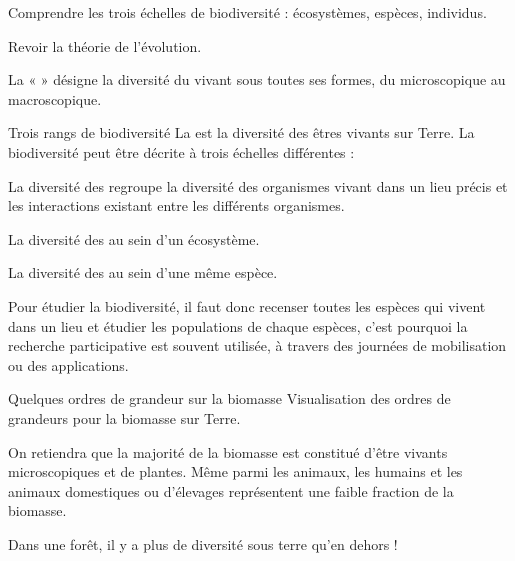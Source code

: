 \begin{multicols}{2}
\begin{objectifs}
  \item Comprendre les trois échelles de biodiversité : écosystèmes, espèces, individus.
  \item Revoir la théorie de l'évolution.
\end{objectifs}

\begin{contexte}
  La «  » désigne la diversité du vivant sous toutes ses formes, du microscopique au macroscopique.
  
\end{contexte}

\begin{doc}{Trois rangs de biodiversité}
  La  est la diversité des êtres vivants sur Terre. 
  La biodiversité peut être décrite à trois échelles différentes :
  \begin{listePoints}
    \item La diversité des  regroupe la diversité des organismes vivant dans un lieu précis et les interactions existant entre les différents organismes.
    \item La diversité des  au sein d'un écosystème.
    \item La diversité des  au sein d'une même espèce.
  \end{listePoints}

  Pour étudier la biodiversité, il faut donc recenser toutes les espèces qui vivent dans un lieu et étudier les populations de chaque espèces, c'est pourquoi la recherche participative est souvent utilisée, à travers des journées de mobilisation ou des applications.
\end{doc}

\begin{doc}{Quelques ordres de grandeur sur la biomasse}
  \textcolor{couleurPrim}{\faArrowLeft} Visualisation des ordres de grandeurs pour la biomasse sur Terre.

  On retiendra que la majorité de la biomasse est constitué d'être vivants microscopiques et de plantes.
  Même parmi les animaux, les humains et les animaux domestiques ou d'élevages représentent une faible fraction de la biomasse.
  
  Dans une forêt, il y a plus de diversité sous terre qu'en dehors !
\end{doc}

\end{multicols}

